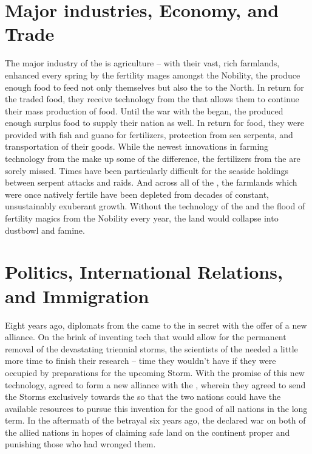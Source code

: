 \documentclass[blue]{GL2020}
\begin{document}
\section*{Major industries, Economy, and Trade}
The major industry of the \pFarm{} is agriculture -- with their vast, rich farmlands, enhanced every spring by the fertility mages amongst the Nobility, the \pFarmers{} produce enough food to feed not only themselves but also the \pTech{} to the North.  In return for the traded food, they receive technology from the \pTech{} that allows them to continue their mass production of food.  Until the war with the \pShippies{} began, the \pFarm{} produced enough surplus food to supply their nation as well.  In return for food, they were provided with fish and guano for fertilizers, protection from sea serpents, and transportation of their goods.  While the newest innovations in farming technology from the \pTech{} make up some of the difference, the fertilizers from the \pShip{} are sorely missed.  Times have been particularly difficult for the seaside holdings between serpent attacks and \pShip{} raids.  And across all of the \pFarm{}, the farmlands which were once natively fertile have been depleted from decades of constant, unsustainably exuberant growth.  Without the technology of the \pTech{} and the flood of fertility magics from the Nobility every year, the land would collapse into dustbowl and famine.

\section*{Politics, International Relations, and Immigration}
Eight years ago, diplomats from the \pTech{} came to the \pFarm{} in secret with the offer of a new alliance.  On the brink of inventing tech that would allow for the permanent removal of the devastating triennial storms, the scientists of the \pTech{} needed a little more time to finish their research – time they wouldn’t have if they were occupied by preparations for the upcoming Storm.  With the promise of this new technology, \cQueen{\Majesty} \cQueen{} agreed to form a new alliance with the \pTech{}, wherein they agreed to send the Storms exclusively towards the \pShip{} so that the two nations could have the available resources to pursue this invention for the good of all nations in the long term.  In the aftermath of the betrayal six years ago, the \pShip{} declared war on both of the allied nations in hopes of claiming safe land on the continent proper and punishing those who had wronged them.
\end{document}
